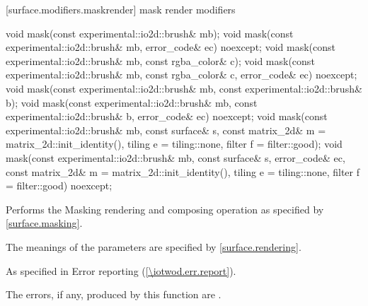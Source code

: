  [surface.modifiers.maskrender] { mask render modifiers}

\begin{itemdecl}
void mask(const experimental::io2d::brush& mb);
void mask(const experimental::io2d::brush& mb, error_code& ec)
  noexcept;
void mask(const experimental::io2d::brush& mb, const rgba_color& c);
void mask(const experimental::io2d::brush& mb, const rgba_color& c, 
  error_code& ec) noexcept;
void mask(const experimental::io2d::brush& mb,
  const experimental::io2d::brush& b);
void mask(const experimental::io2d::brush& mb,
  const experimental::io2d::brush& b, error_code& ec) noexcept;
void mask(const experimental::io2d::brush& mb, const surface& s,
  const matrix_2d& m = matrix_2d::init_identity(), tiling e = tiling::none, 
  filter f = filter::good);
void mask(const experimental::io2d::brush& mb, const surface& s, error_code& ec,
  const matrix_2d& m = matrix_2d::init_identity(), tiling e = tiling::none,
  filter f = filter::good) noexcept;
\end{itemdecl}
\begin{itemdescr}
\pnum
\effects
Performs the Masking rendering and composing operation as specified by \ref{surface.masking}.

\pnum
The meanings of the parameters are specified by \ref{surface.rendering}.

\pnum
\throws
As specified in Error reporting (\ref{\iotwod.err.report}).

\pnum
\errors
The errors, if any, produced by this function are .
\end{itemdescr}

